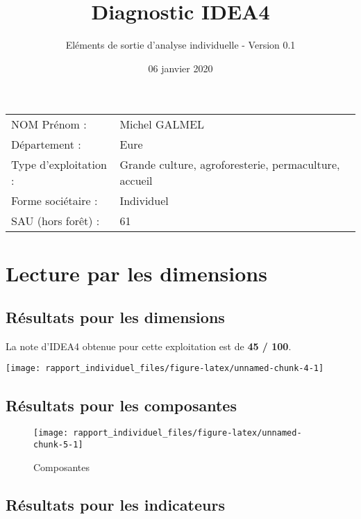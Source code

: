 \documentclass[13pt,]{article}
\title{Diagnostic IDEA4}
\subtitle{Eléments de sortie d'analyse individuelle - Version 0.1}
\author{}
\date{06 janvier 2020}
\begin{document}
\maketitle

{
\setcounter{tocdepth}{3}
\tableofcontents
}

\vspace{+3cm}
\Large

\begin{longtable}[]{@{}ll@{}}
\toprule
\endhead
NOM Prénom : & Michel GALMEL\tabularnewline
Département : & Eure\tabularnewline
Type d'exploitation : & Grande culture, agroforesterie, permaculture,
accueil\tabularnewline
Forme sociétaire : & Individuel\tabularnewline
SAU (hors forêt) : & 61\tabularnewline
\bottomrule
\end{longtable}

\newpage

\hypertarget{lecture-par-les-dimensions}{%
\section{Lecture par les dimensions}\label{lecture-par-les-dimensions}}

\hypertarget{resultats-pour-les-dimensions}{%
\subsection{Résultats pour les
dimensions}\label{resultats-pour-les-dimensions}}

\Large

La note d'IDEA4 obtenue pour cette exploitation est de \textbf{45 /
100}.

\large

\texttt{[image: rapport\_individuel\_files/figure-latex/unnamed-chunk-4-1]}

\hypertarget{resultats-pour-les-composantes}{%
\subsection{Résultats pour les
composantes}\label{resultats-pour-les-composantes}}

\begin{figure}[H]
\texttt{[image: rapport\_individuel\_files/figure-latex/unnamed-chunk-5-1]} \caption{Composantes}\label{fig:unnamed-chunk-5}
\end{figure}

\hypertarget{resultats-pour-les-indicateurs}{%
\subsection{Résultats pour les
indicateurs}\label{resultats-pour-les-indicateurs}}
\end{document}
